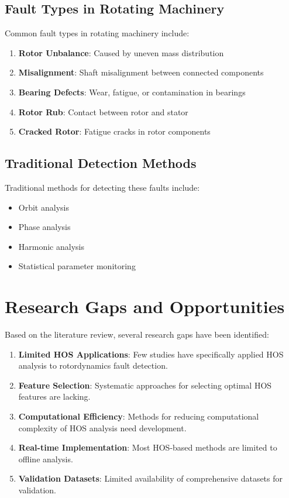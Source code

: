 \subsection{Fault Types in Rotating Machinery}

Common fault types in rotating machinery include:

\begin{enumerate}
    \item \textbf{Rotor Unbalance}: Caused by uneven mass distribution
    \item \textbf{Misalignment}: Shaft misalignment between connected components
    \item \textbf{Bearing Defects}: Wear, fatigue, or contamination in bearings
    \item \textbf{Rotor Rub}: Contact between rotor and stator
    \item \textbf{Cracked Rotor}: Fatigue cracks in rotor components
\end{enumerate}

\subsection{Traditional Detection Methods}

Traditional methods for detecting these faults include:

\begin{itemize}
    \item Orbit analysis
    \item Phase analysis
    \item Harmonic analysis
    \item Statistical parameter monitoring
\end{itemize}

\section{Research Gaps and Opportunities}

Based on the literature review, several research gaps have been identified:

\begin{enumerate}
    \item \textbf{Limited HOS Applications}: Few studies have specifically applied HOS analysis to rotordynamics fault detection.
    \item \textbf{Feature Selection}: Systematic approaches for selecting optimal HOS features are lacking.
    \item \textbf{Computational Efficiency}: Methods for reducing computational complexity of HOS analysis need development.
    \item \textbf{Real-time Implementation}: Most HOS-based methods are limited to offline analysis.
    \item \textbf{Validation Datasets}: Limited availability of comprehensive datasets for validation.
\end{enumerate}

